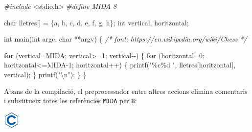 \documentclass[]{book}
\newenvironment{Shaded}{\begin{snugshade}}{\end{snugshade}}
\newcommand{\CharTok}[1]{\textcolor[rgb]{0.31,0.60,0.02}{#1}}
\newcommand{\CommentTok}[1]{\textcolor[rgb]{0.56,0.35,0.01}{\textit{#1}}}
\newcommand{\ControlFlowTok}[1]{\textcolor[rgb]{0.13,0.29,0.53}{\textbf{#1}}}
\newcommand{\DataTypeTok}[1]{\textcolor[rgb]{0.13,0.29,0.53}{#1}}
\newcommand{\DecValTok}[1]{\textcolor[rgb]{0.00,0.00,0.81}{#1}}
\newcommand{\ImportTok}[1]{#1}
\newcommand{\NormalTok}[1]{#1}
\newcommand{\PreprocessorTok}[1]{\textcolor[rgb]{0.56,0.35,0.01}{\textit{#1}}}
\newcommand{\SpecialCharTok}[1]{\textcolor[rgb]{0.00,0.00,0.00}{#1}}
\newcommand{\StringTok}[1]{\textcolor[rgb]{0.31,0.60,0.02}{#1}}
\begin{document}
\begin{Shaded}
\begin{Highlighting}[]
\PreprocessorTok{\#include }\ImportTok{\textless{}stdio.h\textgreater{}}
\PreprocessorTok{\#define MIDA 8}

\DataTypeTok{char}\NormalTok{ lletres[] = \{}\CharTok{\textquotesingle{}a\textquotesingle{}}\NormalTok{, }\CharTok{\textquotesingle{}b\textquotesingle{}}\NormalTok{, }\CharTok{\textquotesingle{}c\textquotesingle{}}\NormalTok{, }\CharTok{\textquotesingle{}d\textquotesingle{}}\NormalTok{, }\CharTok{\textquotesingle{}e\textquotesingle{}}\NormalTok{, }\CharTok{\textquotesingle{}f\textquotesingle{}}\NormalTok{, }\CharTok{\textquotesingle{}g\textquotesingle{}}\NormalTok{, }\CharTok{\textquotesingle{}h\textquotesingle{}}\NormalTok{\};}
\DataTypeTok{int}\NormalTok{ vertical, horitzontal;}

\DataTypeTok{int}\NormalTok{ main(}\DataTypeTok{int}\NormalTok{ argc, }\DataTypeTok{char}\NormalTok{ **argv) \{}
    \CommentTok{/* font: https://en.wikipedia.org/wiki/Chess */}

    \ControlFlowTok{for}\NormalTok{ (vertical=MIDA; vertical\textgreater{}=}\DecValTok{1}\NormalTok{; vertical{-}{-}) \{}
        \ControlFlowTok{for}\NormalTok{ (horitzontal=}\DecValTok{0}\NormalTok{; horitzontal\textless{}=MIDA{-}}\DecValTok{1}\NormalTok{; horitzontal++) \{}
\NormalTok{            printf(}\StringTok{"\%c\%d "}\NormalTok{, lletres[horitzontal], vertical);}
\NormalTok{        \}}
\NormalTok{        printf(}\StringTok{"}\SpecialCharTok{\textbackslash{}n}\StringTok{"}\NormalTok{);}
\NormalTok{    \}}
\NormalTok{\}}
\end{Highlighting}
\end{Shaded}

Abans de la compilació, el preprocessador entre altres accions elimina comentaris i substitueix totes les referències \texttt{MIDA} per \texttt{8}:

\includegraphics{./img/c.png}
\end{document}
